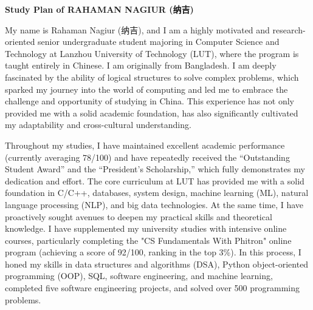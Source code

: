 \documentclass[12pt,a4paper]{article}
\begin{document}
\begin{CJK*}{UTF8}{gbsn}
    \thispagestyle{plain}



\begin{center}

    \large{ \bfseries{ Study Plan of RAHAMAN NAGIUR (纳吉)}}


    \vspace*{0.2cm}


    
\end{center}

My name is Rahaman Nagiur (纳吉), and I am a highly motivated and research-oriented senior undergraduate student majoring in Computer Science and Technology at Lanzhou University of Technology (LUT), where the program is taught entirely in Chinese. I am originally from Bangladesh. I am deeply fascinated by the ability of logical structures to solve complex problems, which sparked my journey into the world of computing and led me to embrace the challenge and opportunity of studying in China. This experience has not only provided me with a solid academic foundation, has also significantly cultivated my adaptability and cross-cultural understanding. \newline

Throughout my studies, I have maintained excellent academic performance (currently averaging 78/100) and have repeatedly received the “Outstanding Student Award” and the “President's Scholarship,” which fully demonstrates my dedication and effort. The core curriculum at LUT has provided me with a solid foundation in C/C++, databases, system design, machine learning (ML), natural language processing (NLP), and big data technologies. At the same time, I have proactively sought avenues to deepen my practical skills and theoretical knowledge. I have supplemented my university studies with intensive online courses, particularly completing the "CS Fundamentals With Phitron" online program (achieving a score of 92/100, ranking in the top 3\%). In this process, I honed my skills in data structures and algorithms (DSA), Python object-oriented programming (OOP), SQL, software engineering, and machine learning, completed five software engineering projects, and solved over 500 programming problems. \newline


\end{CJK*}
\end{document}
